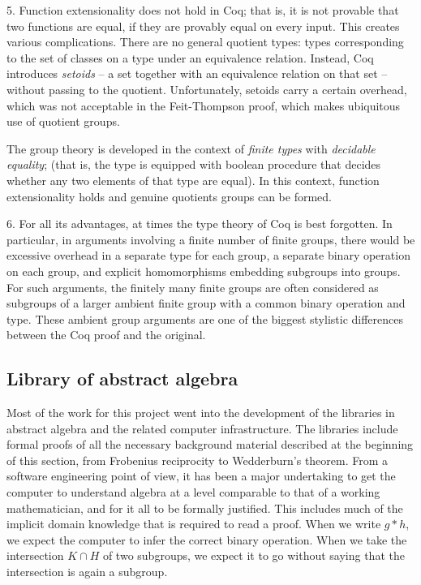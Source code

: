 \documentclass[brochure,english,12pt]{bourbaki}
\theoremstyle{plain}
\begin{document}
5.  Function extensionality does not hold in Coq; that is, it is not provable 
that two functions are equal, if they are provably equal on every input.  This creates various
complications.  There are no general quotient types: types corresponding
to the set of classes on a type under an equivalence relation.  Instead, Coq introduces {\it setoids}  --
 a set together 
with an equivalence relation on that set -- without passing to the quotient.  Unfortunately, setoids carry a certain
overhead, which was not acceptable in the Feit-Thompson proof, which makes ubiquitous use of quotient
groups.   

The group theory is developed in the context of {\it finite types} with {\it decidable equality};
(that is, the type is equipped with boolean procedure that decides whether any two elements of that type are equal).
In this context, function extensionality holds and genuine quotients groups can be formed.


6.  For all its advantages, at times the type theory of Coq is best forgotten.  In particular,
in arguments involving a finite number of finite groups, there would be excessive overhead in
 a separate type for each group, a separate binary operation on each group, 
and explicit homomorphisms embedding subgroups into groups.
 For such arguments, the finitely many finite groups are
often considered as subgroups of a larger ambient finite group with a common binary
operation and type.  These ambient group arguments are one of the biggest stylistic differences
between the Coq proof and the original.


\subsection{Library of abstract algebra}

Most of the work for this project went into the development of the libraries in
abstract algebra and the related computer infrastructure.  The libraries include formal proofs of all
 the necessary background material described at the beginning of this section, from Frobenius reciprocity
 to Wedderburn's theorem.  From a software engineering point of view, it has
been a major undertaking to get the computer to understand algebra at a level
comparable to that of a working mathematician, and for it all to be formally
justified.  This  includes much of the implicit domain knowledge that is required to
read a proof.  When we write $g*h$, we expect the computer to infer the correct binary operation.  
When we take the intersection $K\cap H$ of two subgroups, we expect it to go without
saying that the intersection is again a subgroup.
\end{document}
